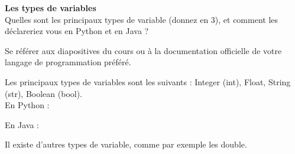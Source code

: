 \begin{Exercice}[5 minutes]  \textbf{Les types de variables}\\
    
    Quelles sont les principaux types de variable (donnez en 3), et comment les déclareriez vous en Python et en Java ? \\

    \begin{conseil}
    
        Se référer aux diapositives du cours ou à la documentation officielle de votre langage de programmation préféré.
        
    \end{conseil}
    \begin{solution}
    
        Les principaux types de variables sont les suivants : Integer (int), Float, String (str), Boolean (bool).\\

		En Python :    
        
    	 
    	
    	
    	En Java : 
    	
    	 
    	
    	Il existe d'autres types de variable, comme par exemple les double.
 
    \end{solution}
\end{Exercice}


